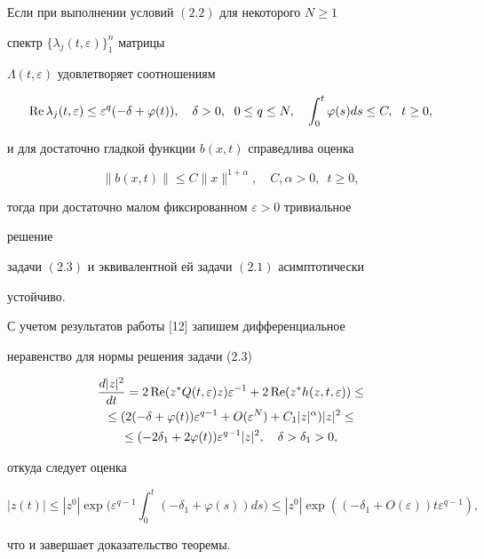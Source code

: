 \begin{thms} 


Если при выполнении условий $(2.2)$ для некоторого $N\ge1$ 


спектр $\{\lambda_j(t,\varepsilon)\}^n_1$ матрицы 


$\Lambda(t,\varepsilon)$ удовлетворяет соотношениям 


$$ 


\re\lambda_j(t,\varepsilon)\le\varepsilon^q(-\delta+\varphi(t)), 


\quad \delta>0,\ \; 0\le q\le N,\quad 


\int^t_0\varphi(s)ds\le C,\ \; t\ge0, 


$$ 


и для достаточно гладкой функции $b(x,t)$ справедлива оценка 


$$ 


\|b(x,t)\|\le C\|x\|^{1+\alpha},\quad C,\alpha>0,\ \; t\ge0, 


$$ 


тогда при достаточно малом фиксированном $\varepsilon>0$ тривиальное 


решение 


задачи $(2.3)$ и эквивалентной ей задачи $(2.1)$ асимптотически 


устойчиво. 


\end{thms} 


 


\begin{pf} 


С учетом результатов работы [12] запишем дифференциальное 


неравенство для нормы решения задачи (2.3) 


\begin{multline*} 


\frac{d|z|^2}{d t}=2\re(z^*Q(t,\varepsilon)z)\varepsilon^{-1}+ 


2\re(z^*h(z,t,\varepsilon))\le \\ 


\le(2(-\delta+\varphi(t))\varepsilon^{q-1}+ 


O(\varepsilon^N)+C_1|z|^\alpha)|z|^2\le \\ 


\le(-2\delta_1+2\varphi(t))\varepsilon^{q-1}|z|^2,\quad 


\delta>\delta_1>0, 


\end{multline*} 


откуда следует оценка 


$$ 


|z(t)|\le|z^0|\exp\bigg(\varepsilon^{q-1}\int^t_0 


(-\delta_1+\varphi(s))ds\bigg)\le 


|z^0|\exp((-\delta_1+O(\varepsilon))t\varepsilon^{q-1}), 


$$ 


что и завершает доказательство теоремы. 


\end{pf} 


